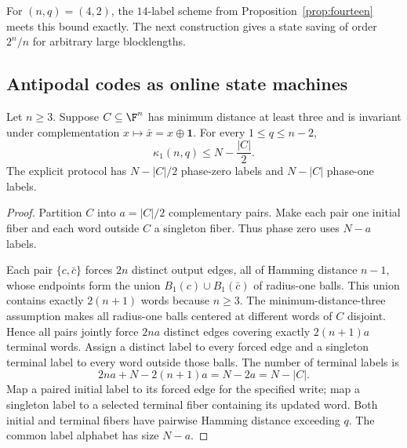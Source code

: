 For $(n,q)=(4,2)$, the $14$-label scheme from Proposition~\ref{prop:fourteen} meets this bound exactly. The next construction gives a state saving of order $2^n/n$ for arbitrary large blocklengths.

\subsection{Antipodal codes as online state machines}

\begin{theorem}\label{thm:v3transfer}
Let $n\ge3$. Suppose $C\subseteq\F^n$ has minimum distance at least three and is invariant under complementation $x\mapsto\bar x=x\oplus\mathbf1$. For every $1\le q\le n-2$,
\[
 \boxed{\quad\kappa_1(n,q)\le N-\frac{|C|}{2}.\quad}
\]
The explicit protocol has $N-|C|/2$ phase-zero labels and $N-|C|$ phase-one labels.
\end{theorem}
\begin{proof}
Partition $C$ into $a=|C|/2$ complementary pairs. Make each pair one initial fiber and each word outside $C$ a singleton fiber. Thus phase zero uses $N-a$ labels.

Each pair $\{c,\bar c\}$ forces $2n$ distinct output edges, all of Hamming distance $n-1$, whose endpoints form the union $B_1(c)\cup B_1(\bar c)$ of radius-one balls. This union contains exactly $2(n+1)$ words because $n\ge3$. The minimum-distance-three assumption makes all radius-one balls centered at different words of $C$ disjoint. Hence all pairs jointly force $2na$ distinct edges covering exactly $2(n+1)a$ terminal words. Assign a distinct label to every forced edge and a singleton terminal label to every word outside those balls. The number of terminal labels is
\[
 2na+N-2(n+1)a=N-2a=N-|C|.
\]
Map a paired initial label to its forced edge for the specified write; map a singleton label to a selected terminal fiber containing its updated word. Both initial and terminal fibers have pairwise Hamming distance exceeding $q$. The common label alphabet has size $N-a$.
\end{proof}

